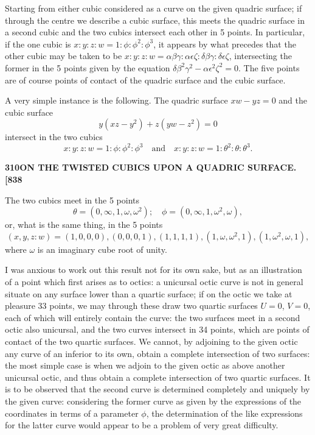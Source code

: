 \documentclass[12pt,a4paper]{article}
\theoremstyle{definition}
\begin{document}
Starting from either cubic considered as a curve on the given quadric surface; if through the centre we describe a cubic surface, this meets the quadric surface in a second cubic and the two cubics intersect each other in 5 points. In particular, if the one cubic is $x : y : z : w = 1 : \phi : \phi^2 : \phi^3$, it appears by what precedes that the other cubic may be taken to be $x : y : z : w = \alpha\beta\gamma : \alpha\epsilon\zeta : \delta\beta\gamma : \delta\epsilon\zeta$, intersecting the former in the 5 points given by the equation $\delta\beta^2\gamma^2 - \alpha\epsilon^2\zeta^2 = 0$. The five points are of course points of contact of the quadric surface and the cubic surface.

A very simple instance is the following. The quadric surface $xw - yz = 0$ and the cubic surface
\[
y(xz - y^2) + z(yw - z^2) = 0
\]
intersect in the two cubics
\[
x : y : z : w = 1 : \phi : \phi^2 : \phi^3 \quad \text{and} \quad x : y : z : w = 1 : \theta^2 : \theta : \theta^3.
\]

\newpage
\setcounter{page}{310}

\noindent\textbf{310}\hfill\textbf{ON THE TWISTED CUBICS UPON A QUADRIC SURFACE.}\hfill\textbf{[838}

\bigskip

\noindent The two cubics meet in the 5 points
\[
\theta = (0, \infty, 1, \omega, \omega^2); \quad \phi = (0, \infty, 1, \omega^2, \omega),
\]
or, what is the same thing, in the 5 points
\[
(x, y, z : w) = (1, 0, 0, 0), (0, 0, 0, 1), (1, 1, 1, 1), (1, \omega, \omega^2, 1), (1, \omega^2, \omega, 1),
\]
where $\omega$ is an imaginary cube root of unity.

I was anxious to work out this result not for its own sake, but as an illustration of a point which first arises as to octics: a unicursal octic curve is not in general situate on any surface lower than a quartic surface; if on the octic we take at pleasure 33 points, we may through these draw two quartic surfaces $U = 0$, $V = 0$, each of which will entirely contain the curve: the two surfaces meet in a second octic also unicursal, and the two curves intersect in 34 points, which are points of contact of the two quartic surfaces. We cannot, by adjoining to the given octic any curve of an inferior to its own, obtain a complete intersection of two surfaces: the most simple case is when we adjoin to the given octic as above another unicursal octic, and thus obtain a complete intersection of two quartic surfaces. It is to be observed that the second curve is determined completely and uniquely by the given curve: considering the former curve as given by the expressions of the coordinates in terms of a parameter $\phi$, the determination of the like expressions for the latter curve would appear to be a problem of very great difficulty.
\end{document}
